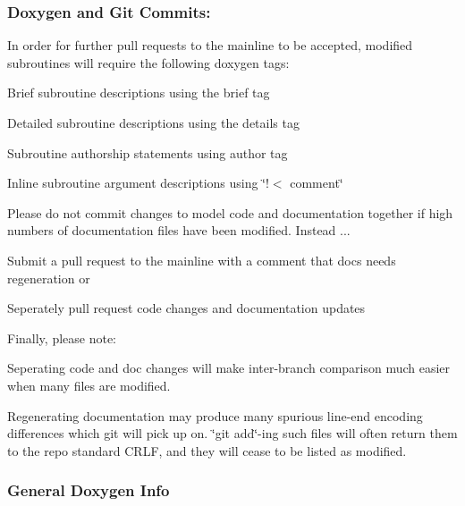 \subsubsection*{\label{_doxygit}%
 Doxygen and Git Commits\+: }

In order for further pull requests to the mainline to be accepted, modified subroutines will require the following doxygen tags\+:
\begin{DoxyEnumerate}
\item Brief subroutine descriptions using the brief tag
\item Detailed subroutine descriptions using the details tag
\item Subroutine authorship statements using author tag
\item Inline subroutine argument descriptions using \char`\"{}!$<$ comment\char`\"{}
\end{DoxyEnumerate}

Please do not commit changes to model code and documentation together if high numbers of documentation files have been modified. Instead ...
\begin{DoxyItemize}
\item Submit a pull request to the mainline with a comment that docs needs regeneration or
\item Seperately pull request code changes and documentation updates
\end{DoxyItemize}

Finally, please note\+:
\begin{DoxyItemize}
\item Seperating code and doc changes will make inter-\/branch comparison much easier when many files are modified.
\item Regenerating documentation may produce many spurious line-\/end encoding differences which git will pick up on. \char`\"{}git add\char`\"{}-\/ing such files will often return them to the repo standard C\+R\+LF, and they will cease to be listed as modified.
\end{DoxyItemize}

\subsubsection*{\label{_doxyinfo}%
 General Doxygen Info }


